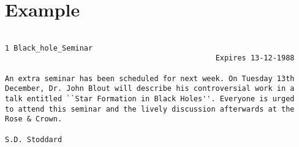 \section {Example}

\begin{verbatim}

1 Black_hole_Seminar
                                                Expires 13-12-1988

An extra seminar has been scheduled for next week. On Tuesday 13th
December, Dr. John Blout will describe his controversial work in a
talk entitled ``Star Formation in Black Holes''. Everyone is urged 
to attend this seminar and the lively discussion afterwards at the 
Rose & Crown. 

S.D. Stoddard

\end{verbatim}

 
